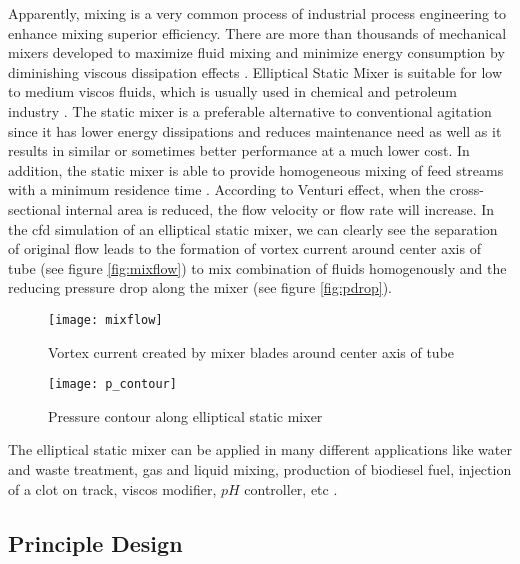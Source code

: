 Apparently, mixing is a very common process of industrial process engineering to enhance mixing superior efficiency. There are more than thousands of mechanical mixers developed to maximize fluid mixing and minimize energy consumption by diminishing viscous dissipation effects \cite{mixing:article}. Elliptical Static Mixer is suitable for low to medium \gls{viscos} fluids, which is usually used in chemical and petroleum industry \cite{static:web}. 
The static mixer is a preferable alternative to conventional agitation since it has lower energy dissipations and reduces maintenance need as well as it results in similar or sometimes better performance at a much lower cost. In addition, the static mixer is able to provide homogeneous mixing of feed streams with a minimum residence time \cite{thakur:article}. According to Venturi effect, when the cross-sectional internal area is reduced, the flow velocity or flow rate will increase. 
In the \gls{cfd} simulation of an elliptical static mixer, we can clearly see the separation of original flow leads to the formation of vortex current around center axis of tube (see figure \vref{fig:mixflow}) to mix combination of fluids homogenously and the reducing pressure drop along the mixer (see figure \vref{fig:pdrop}).

\begin{figure}[h]
  \centering
  \texttt{[image: mixflow]}
  \caption{ Vortex current created by mixer blades around center axis of tube\cite{cfd:article}}
  \label{fig:mixflow}
\end{figure}
\begin{figure}[h]
  \centering
  \texttt{[image: p\_contour]}
  \caption{ Pressure contour along elliptical static mixer\cite{cfd:article}}
  \label{fig:pdrop}
\end{figure}

The elliptical static mixer can be applied in many different applications like water and waste treatment, gas and liquid mixing, production of biodiesel fuel, injection of a clot on track, \gls{viscos} modifier, $pH$ controller, etc \cite{static:web}. 

\subsection{Principle Design}

